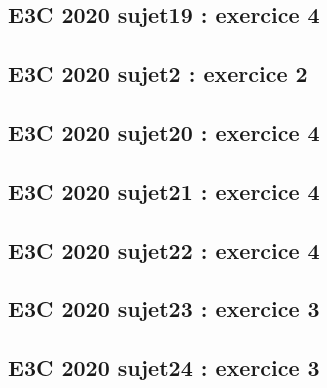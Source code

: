 \documentclass[lang=fr,edition=teacher,layout=sheet]{mxbook}
\begin{document}
\begingroup\endgroup
\par\bigskip
{}\subsection*{E3C 2020 sujet19 : exercice 4}
\begingroup\endgroup
\par\bigskip
{}\subsection*{E3C 2020 sujet2 : exercice 2}
\begingroup\endgroup
\par\bigskip
{}\subsection*{E3C 2020 sujet20 : exercice 4}
\begingroup\endgroup
\par\bigskip
{}\subsection*{E3C 2020 sujet21 : exercice 4}
\begingroup\endgroup
\par\bigskip
{}\subsection*{E3C 2020 sujet22 : exercice 4}
\begingroup\endgroup
\par\bigskip
{}\subsection*{E3C 2020 sujet23 : exercice 3}
\begingroup\endgroup
\par\bigskip
{}\subsection*{E3C 2020 sujet24 : exercice 3}
\end{document}
